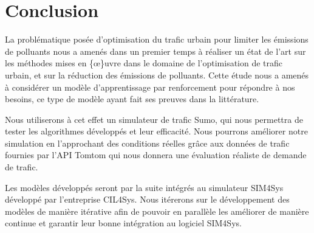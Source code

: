 \documentclass[11pt]{article}
\begin{document}
\section{Conclusion}
\label{sec:org8d415eb}
La problématique posée d'optimisation du trafic urbain pour limiter les émissions de polluants nous a amenés dans un premier temps à réaliser un état de l'art sur les méthodes mises en \{\oe\}uvre dans le domaine de l'optimisation de trafic urbain, et sur la réduction des émissions de polluants. Cette étude nous a amenés à considérer un modèle d'apprentissage par renforcement pour répondre à nos besoins, ce type de modèle ayant fait ses preuves dans la littérature.

Nous utiliserons à cet effet un simulateur de trafic Sumo, qui nous permettra de tester les algorithmes développés et leur efficacité. Nous pourrons améliorer notre simulation en l'approchant des conditions réelles grâce aux données de trafic fournies par l'API Tomtom qui nous donnera une évaluation réaliste de demande de trafic.

Les modèles développés seront par la suite intégrés au simulateur SIM4Sys développé par l'entreprise CIL4Sys. Nous itérerons sur le développement des modèles de manière itérative afin de pouvoir en parallèle les améliorer de manière continue et garantir leur bonne intégration au logiciel SIM4Sys.
\end{document}
